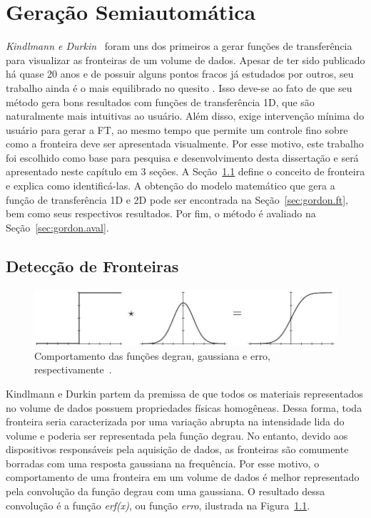 
\chapter{Geração Semiautomática}
\label{ch:gordon}

	\textit{Kindlmann e Durkin}~\cite{gordon} foram uns dos primeiros a gerar funções de transferência para visualizar as fronteiras de um volume de dados. Apesar de ter sido publicado há quase 20 anos e de possuir alguns pontos fracos já estudados por outros, seu trabalho ainda é o mais equilibrado no quesito . Isso deve-se ao fato de que seu método gera bons resultados com funções de transferência 1D, que são naturalmente mais intuitivas ao usuário. Além disso, exige intervenção mínima do usuário para gerar a FT, ao mesmo tempo que permite um controle fino sobre como a fronteira deve ser apresentada visualmente. Por esse motivo, este trabalho foi escolhido como base para pesquisa e desenvolvimento desta dissertação e será apresentado neste capítulo em 3 seções. A Seção~\ref{sec:gordon.bound} define o conceito de fronteira e explica como identificá-las. A obtenção do modelo matemático que gera a função de transferência 1D e 2D pode ser encontrada na Seção~\ref{sec:gordon.ft}, bem como seus respectivos resultados. Por fim, o método é avaliado na Seção~\ref{sec:gordon.aval}.
	
\section{Detecção de Fronteiras}
\label{sec:gordon.bound}

\begin{figure}[b]
	\centering
	\includegraphics[width=1\textwidth]{images/g_boundary_model}
	\caption{Comportamento das funções degrau, gaussiana e erro, respectivamente~\cite{gordon}.}
	\label{fig:boundary_model}
\end{figure}

	Kindlmann e Durkin partem da premissa de que todos os materiais representados no volume de dados possuem propriedades físicas homogêneas. Dessa forma, toda fronteira seria caracterizada por uma variação abrupta na intensidade lida do volume e poderia ser representada pela função degrau. No entanto, devido aos dispositivos responsáveis pela aquisição de dados, as fronteiras são comumente borradas com uma resposta gaussiana na frequência. Por esse motivo, o comportamento de uma fronteira em um volume de dados é melhor representado pela convolução da função degrau com uma gaussiana. O resultado dessa convolução é a função \textit{erf(x)}, ou função \textit{erro}, ilustrada na Figura~\ref{fig:boundary_model}.

